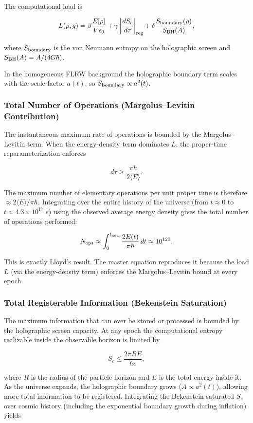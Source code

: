 \documentclass[reprint,amsmath,amssymb,aps,prd,preprintnumbers,superscriptaddress,longbibliography,10pt]{revtex4-2}
\begin{document}
The computational load is

\[
L(\rho,g) = \beta \frac{E[\rho]}{V \epsilon_0} + \gamma \left| \frac{d S_c}{d\tau} \right|_{\rm reg} + \delta \frac{S_{\rm boundary}(\rho)}{S_{\rm BH}(A)},
\]

where \(S_{\rm boundary}\) is the von Neumann entropy on the holographic screen and \(S_{\rm BH}(A) = A / (4G\hbar)\).

In the homogeneous FLRW background the holographic boundary term scales with the scale factor \(a(t)\), so \(S_{\rm boundary} \propto a^2(t)\).

\subsubsection{Total Number of Operations (Margolus--Levitin Contribution)}

The instantaneous maximum rate of operations is bounded by the Margolus–Levitin term. When the energy-density term dominates \(L\), the proper-time reparameterization enforces

\[
d\tau \geq \frac{\pi \hbar}{2 \langle E \rangle}.
\]

The maximum number of elementary operations per unit proper time is therefore \(\approx 2 \langle E \rangle / \pi \hbar\). Integrating over the entire history of the universe (from \(t \approx 0\) to \(t \approx 4.3 \times 10^{17}\) s) using the observed average energy density gives the total number of operations performed:

\[
N_{\rm ops} \approx \int_0^{t_{\rm now}} \frac{2 E(t)}{\pi \hbar} \, dt \approx 10^{120}.
\]

This is exactly Lloyd’s result. The master equation reproduces it because the load \(L\) (via the energy-density term) enforces the Margolus–Levitin bound at every epoch.

\subsubsection{Total Registerable Information (Bekenstein Saturation)}

The maximum information that can ever be stored or processed is bounded by the holographic screen capacity. At any epoch the computational entropy realizable inside the observable horizon is limited by

\[
S_c \leq \frac{2\pi R E}{\hbar c},
\]

where \(R\) is the radius of the particle horizon and \(E\) is the total energy inside it. As the universe expands, the holographic boundary grows (\(A \propto a^2(t)\)), allowing more total information to be registered. Integrating the Bekenstein-saturated \(S_c\) over cosmic history (including the exponential boundary growth during inflation) yields
\end{document}
